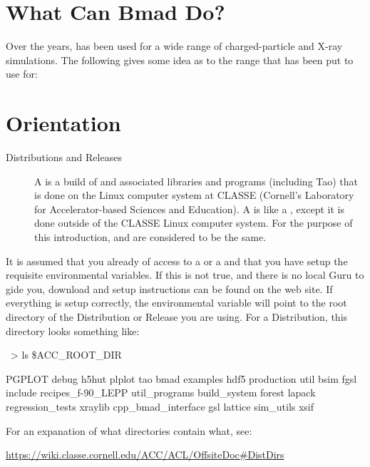 \documentclass{report}
\begin{document}
\section{What Can Bmad Do?}

Over the years, \bmad has been used for a wide range of charged-particle and X-ray
simulations. The following gives some idea as to the range that \bmad has been put to use for:

\section{Orientation}

  \begin{description}
  \item[Distributions and Releases] \Newline
A  is a build of \bmad and associated libraries and programs (including Tao)
that is done on the Linux computer system at CLASSE (Cornell's Laboratory for
Accelerator-based Sciences and Education). A  is like a ,
except it is done outside of the CLASSE Linux computer system.  For the purpose
of this introduction,  and  are considered to be the same.
  \end{description}

It is assumed that you already of access to a  or a  and that
you have setup the requisite environmental variables. If this is not true, and there is no
local Guru to gide you, download and setup instructions can be found on the \bmad web
site. If everything is setup correctly, the environmental variable  will
point to the root directory of the Distribution or Release you are using. For a
Distribution, this directory looks something like:
\begin{example}
  ~> ls \$ACC_ROOT_DIR

  PGPLOT                debug       h5hut        plplot                tao
  bmad                  examples    hdf5         production            util
  bsim                  fgsl        include      recipes_f-90_LEPP     util_programs
  build_system          forest      lapack       regression_tests      xraylib
  cpp_bmad_interface    gsl         lattice      sim_utils             xsif
\end{example}

For an expanation of what directories contain what, see:
\begin{example}
  \url{https://wiki.classe.cornell.edu/ACC/ACL/OffsiteDoc#DistDirs}
\end{example}
\end{document}
